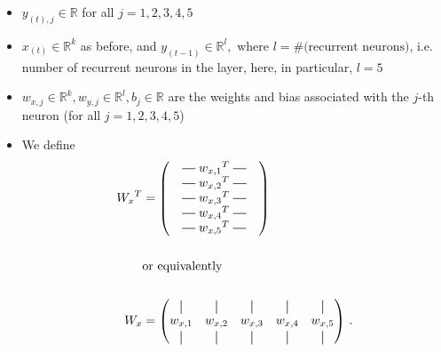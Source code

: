\documentclass{article}
\newcommand*{\vertbar}{\rule[-1ex]{0.5pt}{2.5ex}}
\newcommand*{\horzbar}{\rule[.5ex]{2.5ex}{0.5pt}}
\begin{document}
\begin{itemize}
  \item $y_{(t), j} \in \mathbb{R}$ for all $j=1,2,3,4,5$
  \item $x_{(t)} \in \mathbb{R}^{k}$ as before, and $y_{(t-1)} \in \mathbb{R}^{l},$ where $l = \text{\#(recurrent neurons)}$, i.e. number of recurrent neurons in the layer, here, in particular, $l=5$
  \item $w_{x,j} \in \mathbb{R}^k, w_{y,j} \in \mathbb{R}^l, b_{j} \in \mathbb{R}$ are the weights and bias associated with the $j$-th neuron (for all $j=1,2,3,4,5$)
  \item We define \begin{align*}
    {W_x}^{T} &= \begin{pmatrix}
      \quad\horzbar\;{w_{x,1}}^T{}\;\horzbar\quad \\
      \quad\horzbar\;{w_{x,2}}^T{}\;\horzbar\quad \\
      \quad\horzbar\;{w_{x,3}}^T{}\;\horzbar\quad \\
      \quad\horzbar\;{w_{x,4}}^T{}\;\horzbar\quad \\
      \quad\horzbar\;{w_{x,5}}^T{}\;\horzbar\quad \\
    \end{pmatrix} \\
    \\
    \qquad &{}\text{or equivalently} \\
    \\
    {W_x} &= \begin{pmatrix}
      \vertbar & \vertbar & \vertbar & \vertbar & \vertbar \\
      w_{x,1} & w_{x,2} & w_{x,3} & w_{x,4} & w_{x,5} \\
      \vertbar & \vertbar & \vertbar & \vertbar & \vertbar
    \end{pmatrix}\,.
  \end{align*}
\end{itemize}
\end{document}
